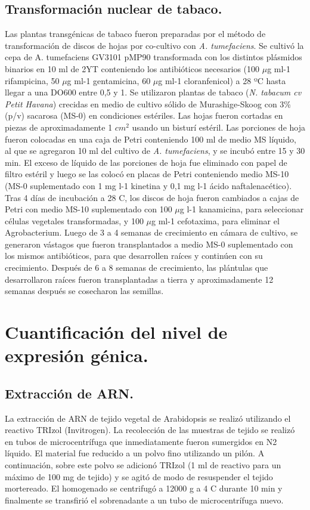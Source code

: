\subsection{Transformación nuclear de tabaco.}
Las plantas transgénicas de tabaco fueron preparadas por el método de transformación de discos de hojas por co-cultivo con \textit{A. tumefaciens}.
Se cultivó la cepa de A. tumefaciens GV3101 pMP90 transformada con los distintos plásmidos binarios en 10 ml de 2YT conteniendo los antibióticos necesarios (100 $\mu$g ml-1 rifampicina, 50 $\mu$g ml-1 gentamicina, 60 $\mu$g ml-1 cloranfenicol) a 28 ºC hasta llegar a una DO600 entre 0,5 y 1.
Se utilizaron plantas de tabaco (\textit{N. tabacum cv Petit Havana}) crecidas en medio de cultivo sólido de Murashige-Skoog con 3\% (p/v) sacarosa (MS-0) en condiciones estériles.
Las hojas fueron cortadas en piezas de aproximadamente 1 $cm^2$ usando un bisturí estéril.
Las porciones de hoja fueron colocadas en una caja de Petri conteniendo 100 ml de medio MS líquido, al que se agregaron 10 ml del cultivo de \textit{A. tumefaciens}, y se incubó entre 15 y 30 min.
El exceso de líquido de las porciones de hoja fue eliminado con papel de filtro estéril y luego se las colocó en placas de Petri conteniendo medio MS-10 (MS-0 suplementado con 1 mg l-1 kinetina y 0,1 mg l-1 ácido naftalenacético).
Tras 4 días de incubación a 28 \degree C, los discos de hoja fueron cambiados a cajas de Petri con medio MS-10 suplementado con 100 $\mu$g l-1 kanamicina, para seleccionar células vegetales transformadas, y 100 $\mu$g ml-1 cefotaxima, para eliminar el Agrobacterium.
Luego de 3 a 4 semanas de crecimiento en cámara de cultivo, se generaron vástagos que fueron transplantados a medio MS-0 suplementado con los mismos antibióticos, para que desarrollen raíces y continúen con su crecimiento.
Después de 6 a 8 semanas de crecimiento, las plántulas que desarrollaron raíces fueron transplantadas a tierra y aproximadamente 12 semanas después se cosecharon las semillas.

\section{Cuantificación del nivel de expresión génica.}

\subsection{Extracción de ARN.}\label{sec:extraccion_ARN}
La extracción de ARN de tejido vegetal de Arabidopsis se realizó utilizando el reactivo TRIzol (Invitrogen).
La recolección de las muestras de tejido se realizó en tubos de microcentrífuga que inmediatamente fueron sumergidos en N2 líquido.
El material fue reducido a un polvo fino utilizando un pilón. A continuación, sobre este polvo se adicionó TRIzol (1 ml de reactivo para un máximo de 100 mg de tejido) y se agitó de modo de resuspender el tejido mortereado.
El homogenado se centrifugó a 12000 g a 4 \degree C durante 10 min y finalmente se transfirió el sobrenadante a un tubo de microcentrífuga nuevo.

